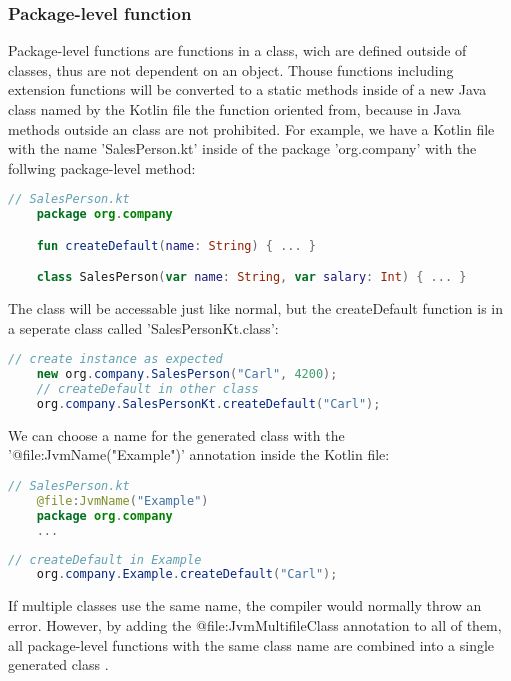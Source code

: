 \documentclass[a4paper, 11pt]{article}
\begin{document}
\subsubsection{Package-level function}
  Package-level functions are functions in a class, wich are defined outside of classes, thus are not dependent on an object. Thouse functions including extension functions will be converted to a static methods inside of a new Java class \cite{interop-package-level-func} named by the Kotlin file the function oriented from, because in Java methods outside an class are not prohibited. For example, we have a Kotlin file with the name 'SalesPerson.kt' inside of the package 'org.company' with the follwing package-level method:
  \begin{lstlisting}[language=Kotlin]
    // SalesPerson.kt
    package org.company

    fun createDefault(name: String) { ... }

    class SalesPerson(var name: String, var salary: Int) { ... }
  \end{lstlisting}
  The class will be accessable just like normal, but the createDefault function is in a seperate class called 'SalesPersonKt.class':
  \begin{lstlisting}[language=Java]
    // create instance as expected
    new org.company.SalesPerson("Carl", 4200);
    // createDefault in other class
    org.company.SalesPersonKt.createDefault("Carl");
  \end{lstlisting}
  We can choose a name for the generated class with the '@file:JvmName("Example")' annotation inside the Kotlin file:
  \begin{lstlisting}[language=Kotlin]
    // SalesPerson.kt
    @file:JvmName("Example")
    package org.company
    ...
  \end{lstlisting}
  \begin{lstlisting}[language=Java]
    // createDefault in Example
    org.company.Example.createDefault("Carl");
  \end{lstlisting}
  If multiple classes use the same name, the compiler would normally throw an error. However, by adding the @file:JvmMultifileClass annotation to all of them, all package-level functions with the same class name are combined into a single generated class \cite{interop-package-level-func}.
\end{document}

